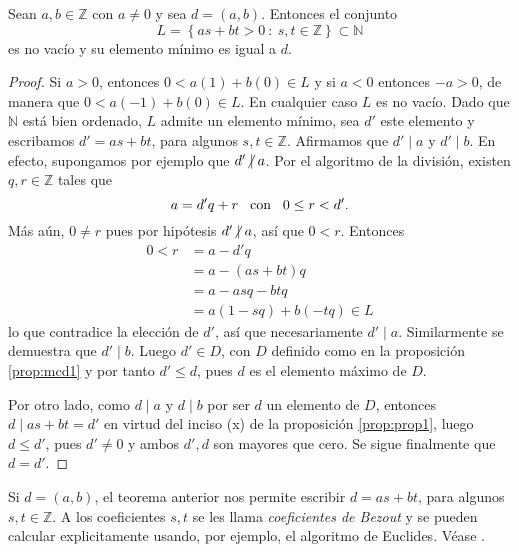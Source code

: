 \begin{theorem}
\label{thm:lin}Sean $a,b\in \mathbb{Z}$ con $a\neq 0$ y sea $d=(a,b)$. Entonces el conjunto 
\begin{equation*}
	L=\left\{a s+ b t>0 \: : \: s,t\in \mathbb{Z}\right\}\subset \mathbb{N}
\end{equation*}
es no vacío y su elemento mínimo es igual a $d$.
\end{theorem}
\begin{proof}
Si $a>0$, entonces $0<a(1)+b(0)\in L$ y si $a<0$ entonces $-a>0$, de manera que $0<a(-1)+b(0)\in L$. En cualquier caso $L$ es no vacío. Dado que $\mathbb{N}$ está bien ordenado, $L$ admite un elemento mínimo, sea $d'$ este elemento y escribamos $d'=a s+ b t$, para algunos $s,t\in \mathbb{Z}$. Afirmamos que $d' \mid a$ y $d'\mid b$. En efecto, supongamos por ejemplo que $d'\centernot\mid a$. Por el algoritmo de la división, existen $q,r\in \mathbb{Z}$ tales que 
\begin{equation*}
	a=d'q+r\hspace*{0.3cm}\textnormal{con}\hspace*{0.3cm}0\leq r<d'.
\end{equation*}
Más aún, $0\neq r$ pues por hipótesis $d'\centernot\mid a$, así que $0<r$. Entonces 
\begin{align*}
	0<r &= a-d'q \\
		&= a-(a s+ b t)q \\
		&= a-a s q-b t q \\
		&= a(1-s q)+b(-t q) \in L
\end{align*}
lo que contradice la elección de $d'$, así que necesariamente $d' \mid a$. Similarmente se demuestra que $d' \mid b$. Luego $d'\in D$, con $D$ definido como en la proposición \eqref{prop:mcd1} y por tanto $d'\leq d$, pues $d$ es el elemento máximo de $D$.
\bigskip

Por otro lado, como $d \mid a$ y $d \mid b$ por ser $d$ un elemento de $D$, entonces $d \mid a s+b t=d'$ en virtud del inciso (x) de la proposición \eqref{prop:prop1}, luego $d\leq d'$, pues $d'\neq 0$ y ambos $d',d$ son mayores que cero. Se sigue finalmente que $d=d'$.
\end{proof}

\begin{remark}
Si $d=(a,b)$, el teorema anterior nos permite escribir $d=a s+ b t$, para algunos $s,t\in \mathbb{Z}$. A los coeficientes $s,t$ se les llama \textit{coeficientes de Bezout} y se pueden calcular explicitamente usando, por ejemplo, el algoritmo de Euclides. Véase \cite{Zal1-2014}.
\end{remark}

